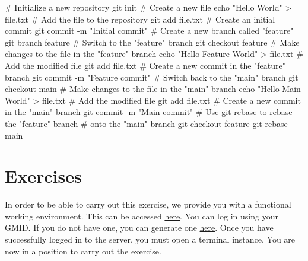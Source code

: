 \documentclass[
  letterpaper,
  DIV=11,
  numbers=noendperiod]{scrreprt}
\newenvironment{Shaded}{\begin{snugshade}}{\end{snugshade}}
\newcommand{\AttributeTok}[1]{\textcolor[rgb]{0.40,0.45,0.13}{#1}}
\newcommand{\BuiltInTok}[1]{\textcolor[rgb]{0.00,0.23,0.31}{#1}}
\newcommand{\CommentTok}[1]{\textcolor[rgb]{0.37,0.37,0.37}{#1}}
\newcommand{\FunctionTok}[1]{\textcolor[rgb]{0.28,0.35,0.67}{#1}}
\newcommand{\NormalTok}[1]{\textcolor[rgb]{0.00,0.23,0.31}{#1}}
\newcommand{\OperatorTok}[1]{\textcolor[rgb]{0.37,0.37,0.37}{#1}}
\newcommand{\StringTok}[1]{\textcolor[rgb]{0.13,0.47,0.30}{#1}}
\begin{document}
\begin{tcolorbox}
\begin{Shaded}
\begin{Highlighting}[]
\CommentTok{\# Initialize a new repository}
\FunctionTok{git}\NormalTok{ init}
\CommentTok{\# Create a new file}
\BuiltInTok{echo} \StringTok{"Hello World"} \OperatorTok{\textgreater{}}\NormalTok{ file.txt}
\CommentTok{\# Add the file to the repository}
\FunctionTok{git}\NormalTok{ add file.txt}
\CommentTok{\# Create an initial commit}
\FunctionTok{git}\NormalTok{ commit }\AttributeTok{{-}m} \StringTok{"Initial commit"}
\CommentTok{\# Create a new branch called "feature"}
\FunctionTok{git}\NormalTok{ branch feature}
\CommentTok{\# Switch to the "feature" branch}
\FunctionTok{git}\NormalTok{ checkout feature}
\CommentTok{\# Make changes to the file in the "feature" branch}
\BuiltInTok{echo} \StringTok{"Hello Feature World"} \OperatorTok{\textgreater{}}\NormalTok{ file.txt}
\CommentTok{\# Add the modified file}
\FunctionTok{git}\NormalTok{ add file.txt}
\CommentTok{\# Create a new commit in the "feature" branch}
\FunctionTok{git}\NormalTok{ commit }\AttributeTok{{-}m} \StringTok{"Feature commit"}
\CommentTok{\# Switch back to the "main" branch}
\FunctionTok{git}\NormalTok{ checkout main}
\CommentTok{\# Make changes to the file in the "main" branch}
\BuiltInTok{echo} \StringTok{"Hello Main World"} \OperatorTok{\textgreater{}}\NormalTok{ file.txt}
\CommentTok{\# Add the modified file}
\FunctionTok{git}\NormalTok{ add file.txt}
\CommentTok{\# Create a new commit in the "main" branch}
\FunctionTok{git}\NormalTok{ commit }\AttributeTok{{-}m} \StringTok{"Main commit"}
\CommentTok{\# Use git rebase to rebase the "feature" branch}
\CommentTok{\# onto the "main" branch}
\FunctionTok{git}\NormalTok{ checkout feature}
\FunctionTok{git}\NormalTok{ rebase main}
\end{Highlighting}
\end{Shaded}

\end{tcolorbox}

\hypertarget{exercises-8}{%
\section{Exercises}\label{exercises-8}}

In order to be able to carry out this exercise, we provide you with a
functional working environment. This can be accessed
\href{https://hub.0x3e8.de/}{here}. You can log in using your GMID. If
you do not have one, you can generate one
\href{https://id.gm.fh-koeln.de/registrierung.php}{here}. Once you have
successfully logged in to the server, you must open a terminal instance.
You are now in a position to carry out the exercise.
\end{document}
